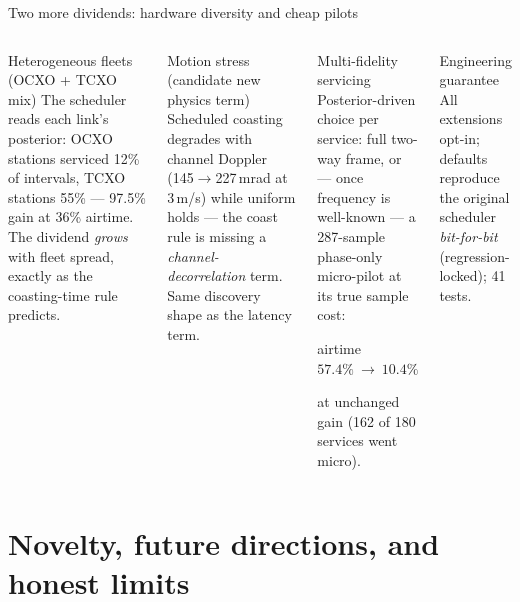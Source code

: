 \documentclass[aspectratio=169,10pt]{beamer}
\begin{document}
\begin{frame}{Two more dividends: hardware diversity and cheap pilots}
  \begin{columns}[T]
    \begin{block}{\small Heterogeneous fleets (OCXO + TCXO mix)}
      \small The scheduler reads each link's posterior: OCXO stations
      serviced 12\% of intervals, TCXO stations 55\% --- 97.5\% gain
      at 36\% airtime. The dividend \emph{grows} with fleet spread,
      exactly as the coasting-time rule predicts.
    \end{block}
    \begin{block}{\small Motion stress (candidate new physics term)}
      \small Scheduled coasting degrades with channel Doppler
      (145$\to$227\,mrad at 3\,m/s) while uniform holds --- the coast
      rule is missing a \emph{channel-decorrelation} term. Same
      discovery shape as the latency term.
    \end{block}
    \begin{block}{\small Multi-fidelity servicing}
      \small Posterior-driven choice per service: full two-way frame,
      or --- once frequency is well-known --- a 287-sample phase-only
      micro-pilot at its true sample cost:
      \begin{center}
        airtime $57.4\%\ \to\ 10.4\%$
      \end{center}
      at unchanged gain (162 of 180 services went micro).
    \end{block}
    \begin{block}{\small Engineering guarantee}
      \small All extensions opt-in; defaults reproduce the original
      scheduler \emph{bit-for-bit} (regression-locked); 41 tests.
    \end{block}
  \end{columns}
\end{frame}

\section{Novelty, future directions, and honest limits}
\end{document}
